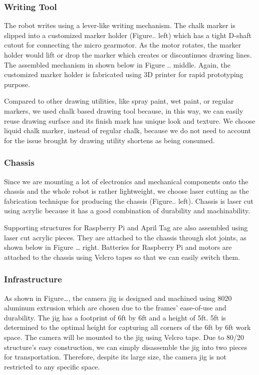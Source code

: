 \subsubsection{Writing Tool}
\label{sec:me_writing}
The robot writes using a lever-like writing mechanism. The chalk marker is slipped into a customized marker holder (Figure.. left) which has a tight D-shaft cutout for connecting the micro gearmotor. As the motor rotates, the marker holder would lift or drop the marker which creates or discontinues drawing lines. The assembled mechanism in shown below in Figure .. middle. Again, the customized marker holder is fabricated using 3D printer for rapid prototyping purpose. 

Compared to other drawing utilities, like spray paint, wet paint, or regular markers, we used chalk based drawing tool because, in this way, we can easily reuse drawing surface and its finish mark has unique look and texture. We choose liquid chalk marker, instead of regular chalk, because we do not need to account for the issue brought by drawing utility shortens as being consumed. 

\subsubsection{Chassis}
\label{sec:me_chassis}
Since we are mounting a lot of electronics and mechanical components onto the chassis and the whole robot is rather lightweight, we choose laser cutting as the fabrication technique for producing the chassis (Figure.. left). Chassis is laser cut using acrylic because it has a good combination of durability and machinability. 

Supporting structures for Raspberry Pi and April Tag are also assembled using laser cut acrylic pieces. They are attached to the chassis through slot joints, as shown below in Figure … right. Batteries for Raspberry Pi and motors are attached to the chassis using Velcro tapes so that we can easily switch them. 

\subsubsection{Infrastructure}
\label{sec:me_infrastructure}
As shown in Figure…, the camera jig is designed and machined using 8020 aluminum extrusion which are chosen due to the frames’ ease-of-use and durability. The jig has a footprint of 6ft by 6ft and a height of 5ft.  5ft is determined to the optimal height for capturing all corners of the 6ft by 6ft work space. The camera will be mounted to the jig using Velcro tape. Due to 80/20 structure’s easy construction, we can simply disassemble the jig into two pieces for transportation. Therefore, despite its large size, the camera jig is not restricted to any specific space. 

